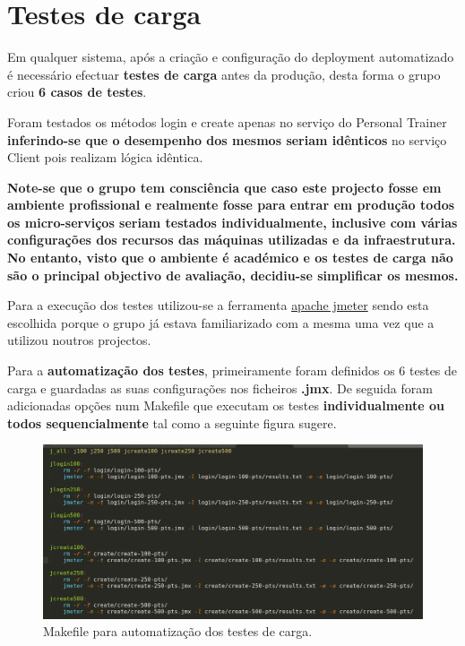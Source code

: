 \chapter{Testes de carga}
\label{chap:testes}

\hspace{5mm} Em qualquer sistema, após a criação e configuração do deployment automatizado é necessário efectuar \textbf{testes de carga} antes da produção, desta forma o grupo criou \textbf{6 casos de testes}.

\hspace{5mm} Foram testados os métodos login e create apenas no serviço do Personal Trainer \textbf{inferindo-se que o desempenho dos mesmos seriam idênticos} no serviço Client pois realizam lógica idêntica.

\hspace{5mm} \textbf{Note-se que o grupo tem consciência que caso este projecto fosse em ambiente profissional e realmente fosse para entrar em produção todos os micro-serviços seriam testados individualmente, inclusive com várias configurações dos recursos das máquinas utilizadas e da infraestrutura. No entanto, visto que o ambiente é académico e os testes de carga não são o principal objectivo de avaliação, decidiu-se simplificar os mesmos.}

\hspace{5mm} Para a execução dos testes utilizou-se a ferramenta \href{https://jmeter.apache.org}{apache jmeter} sendo esta escolhida porque o grupo já estava familiarizado com a mesma uma vez que a utilizou noutros projectos.

\hspace{5mm} Para a \textbf{automatização dos testes}, primeiramente foram definidos os 6 testes de carga e guardadas as suas configurações nos ficheiros \textbf{.jmx}. De seguida foram adicionadas opções num Makefile que executam os testes \textbf{individualmente ou todos sequencialmente} tal como a seguinte figura sugere.

\begin{figure}[H]
    \centering
    \includegraphics[scale=0.4]{images/jmeter.png}
    \caption{Makefile para automatização dos testes de carga.}
    \label{fig:makefile}
\end{figure}

